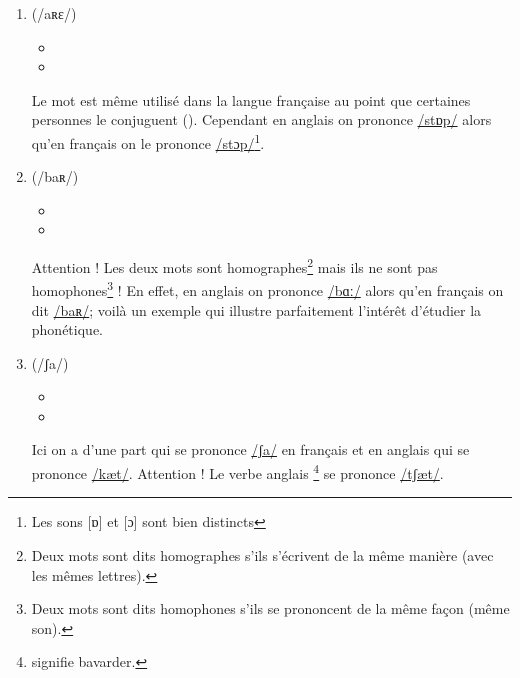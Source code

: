 \begin{enumerate}
\item {} (/aʀɛ/)
  \begin{itemize}
  \item {}
    \item {}
    \end{itemize}
    Le mot  est même utilisé dans la langue française
    au point que certaines personnes le conjuguent ().
    Cependant en anglais on
    prononce
    \href{https://en.oxforddictionaries.com/definition/stop}{/stɒp/}
    alors qu'en français on le prononce
    \href{http://www.wordreference.com/fren/stop}{/stɔp/}\footnote{Les
      sons [ɒ] et [ɔ] sont bien distincts}.
\item {} (/baʀ/)
  \begin{itemize}
  \item {}
  \item {}
  \end{itemize}
    Attention ! Les deux mots sont homographes\footnote{Deux mots sont
      dits homographes s'ils s'écrivent de la même manière (avec les
      mêmes lettres).} mais ils ne sont pas homophones\footnote{Deux
      mots sont dits homophones s'ils se prononcent de la même façon
      (même son).} ! En effet, en anglais on prononce
    \href{https://en.oxforddictionaries.com/definition/bar}{/bɑː/}
    alors qu'en français on dit \href{http://www.wordreference.com/fren/bar}{/baʀ/}; voilà un exemple qui illustre parfaitement l'intérêt
    d'étudier la phonétique.
  \item {} (/ʃa/)
    \begin{itemize}
    \item {}
    \item {}
    \end{itemize}
    Ici on a d'une part  qui se prononce
    \href{http://www.wordreference.com/fren/chat}{/ʃa/} en français et
     en anglais qui se prononce
    \href{http://www.wordreference.com/enfr/cat}{/kæt/}. Attention !
    Le verbe anglais \footnote{ signifie
      bavarder.} se prononce
    \href{https://en.oxforddictionaries.com/definition/chat}{/tʃæt/}. 
\end{enumerate}


